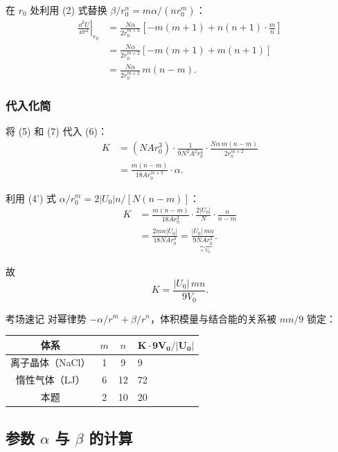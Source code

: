 在 $r_0$ 处利用 (2) 式替换 $\beta/r_0^n = m\alpha/(nr_0^m)$：
\begin{align*}
  \left.\frac{\dd^2 U}{\dd r^2}\right|_{r_0}
  &= \frac{N\alpha}{2r_0^{m+2}}\left[-m(m+1) + n(n+1)\cdot\frac{m}{n}\right] \\
  &= \frac{N\alpha}{2r_0^{m+2}}\left[-m(m+1) + m(n+1)\right] \\
  &= \frac{N\alpha}{2r_0^{m+2}}\,m(n-m). \tag{7}
\end{align*}

\subsubsection{代入化简}

将 (5) 和 (7) 代入 (6)：
\begin{align*}
  K &= (NAr_0^3)\cdot\frac{1}{9N^2A^2r_0^4}\cdot\frac{N\alpha\,m(n-m)}{2r_0^{m+2}} \\
    &= \frac{m(n-m)}{18Ar_0^{m+3}}\cdot\alpha.
\end{align*}

利用 (4') 式 $\alpha/r_0^m = 2|U_0|n/[N(n-m)]$：
\begin{align*}
  K &= \frac{m(n-m)}{18Ar_0^3}\cdot\frac{2|U_0|}{N}\cdot\frac{n}{n-m} \\
    &= \frac{2mn|U_0|}{18NAr_0^3}
     = \frac{|U_0|\,mn}{9\underbrace{NAr_0^3}_{=V_0}}.
\end{align*}

故
\[
  \boxed{ K = \frac{|U_0|\,mn}{9V_0} }. \tag{证毕}
\]

\begin{tipbox}{考场速记}
对幂律势 $-\alpha/r^m + \beta/r^n$，体积模量与结合能的关系被 $mn/9$ 锁定：
\begin{center}
\renewcommand{\arraystretch}{1.4}
\begin{tabular}{|c|c|c|l|}
\hline
\textbf{体系} & $m$ & $n$ & $\bm{K\cdot 9V_0/|U_0|}$ \\
\hline
离子晶体（NaCl） & 1 & 9 & 9 \\
惰性气体（LJ） & 6 & 12 & 72 \\
本题 & 2 & 10 & 20 \\
\hline
\end{tabular}
\end{center}
\end{tipbox}

\subsection{参数 $\alpha$ 与 $\beta$ 的计算}

